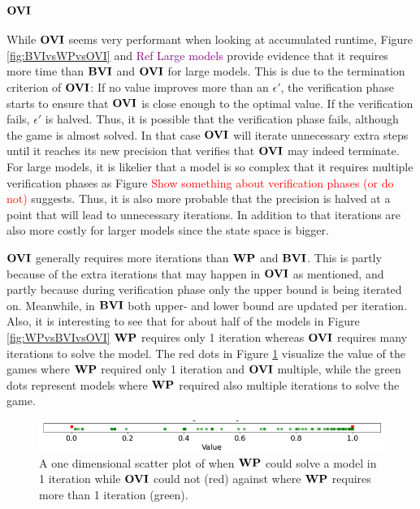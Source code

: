 \subsubsection*{$\OVI$}
While $\OVI$ seems very performant when looking at accumulated runtime, Figure \ref{fig:BVIvsWPvsOVI} and \textcolor{purple}{Ref Large models} provide evidence that it requires more time than $\mathbf{BVI}$ and $\OVI$ for large models.
This is due to the termination criterion of $\OVI$: 
If no value improves more than an $\epsilon'$, the verification phase starts to ensure that $\OVI$ is close enough to the optimal value.
If the verification fails, $\epsilon'$ is halved. 
Thus, it is possible that the verification phase fails, although the game is almost solved.
In that case $\OVI$ will iterate unnecessary extra steps until it reaches its new precision that verifies that $\OVI$ may indeed terminate.
For large models, it is likelier that a model is so complex that it requires multiple verification phases as Figure
\textcolor{red}{Show something about verification phases (or do not)} suggests. 
Thus, it is also more probable that the precision is halved at a point that will lead to unnecessary iterations.
In addition to that iterations are also more costly for larger models since the state space is bigger.

$\OVI$ generally requires more iterations than $\mathbf{WP}$ and $\mathbf{BVI}$. This is partly because of the extra iterations that may happen in $\OVI$ as mentioned, 
and partly because during verification phase only the upper bound is being iterated on. Meanwhile, in $\mathbf{BVI}$ both upper- and lower bound are updated per iteration.
Also, it is interesting to see that for about half of the models in Figure \ref{fig:WPvsBVIvsOVI} $\mathbf{WP}$ requires only 1 iteration whereas $\OVI$ requires many iterations to solve the model.
The red dots in Figure \ref{fig:OVIinstantCompute} visualize the value of the games where $\mathbf{WP}$ required only 1 iteration and $\OVI$ multiple,
while the green dots represent models where $\mathbf{WP}$ required also multiple iterations to solve the game.

\begin{figure}[h!]
    \centering
    \includegraphics[width=1\textwidth]{figures/OVI_Bad_At_Computing_Instant_Values.png}
    \caption[$\OVI$ cannot instantly compute models]{
        A one dimensional scatter plot of when $\mathbf{WP}$ could solve a model in 1 iteration while $\OVI$ could not (red) 
        against where $\mathbf{WP}$ requires more than 1 iteration (green).
    }
    \label{fig:OVIinstantCompute}
\end{figure}
\FloatBarrier

